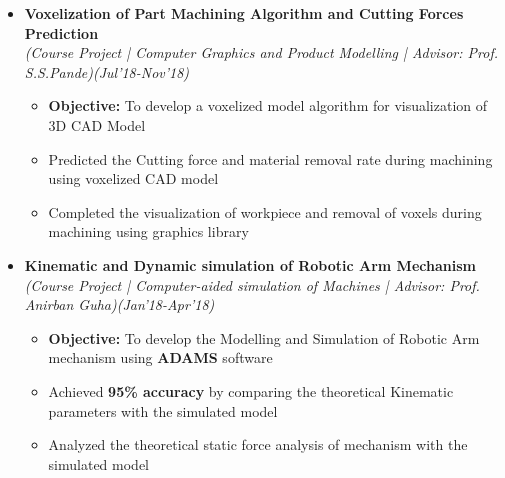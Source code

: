 \documentclass[a4paper,10pt]{article}
\begin{document}
\begin{itemize}
\item \textbf{Voxelization of Part Machining Algorithm and Cutting Forces Prediction}\\
\emph{(Course Project | Computer Graphics and Product Modelling | Advisor: Prof. S.S.Pande)\hfill (Jul'18-Nov’18)} \\[-0.4cm]
	\begin{itemize}[noitemsep,nolistsep]
    \item \textbf{Objective:} To develop a voxelized model algorithm for visualization of 3D CAD Model
    \item Predicted the Cutting force and material removal rate during machining using voxelized CAD model
    \item Completed the visualization of workpiece and removal of voxels during machining using graphics library
	\end{itemize}
	
\item \textbf{Kinematic and Dynamic simulation of Robotic Arm Mechanism} \\
\emph{(Course Project | Computer-aided simulation of Machines | Advisor: Prof. Anirban Guha)\hfill (Jan’18-Apr'18)} \\[-0.4cm]
	\begin{itemize}[noitemsep,nolistsep]
    \item \textbf{Objective:} To develop the Modelling and Simulation of Robotic Arm mechanism using \textbf{ADAMS} software
    \item Achieved \textbf{95\% accuracy} by comparing the theoretical Kinematic parameters with the simulated model 
    \item Analyzed the theoretical static force analysis of mechanism with the simulated model
	\end{itemize}


\end{itemize}
\end{document}
